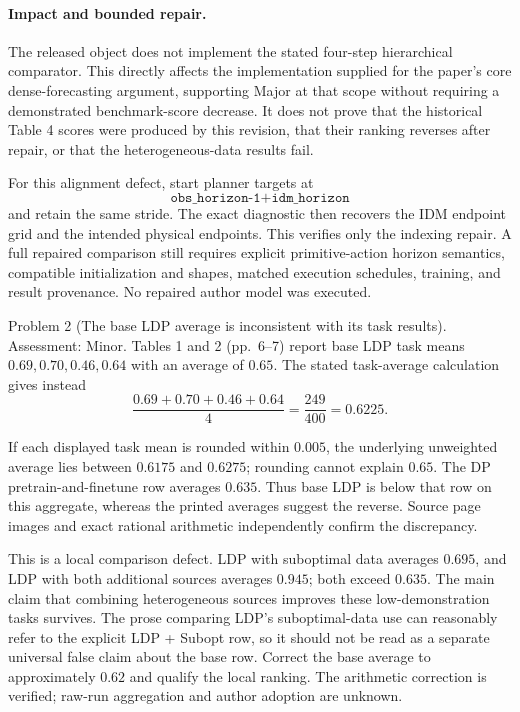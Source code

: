 \documentclass[10pt]{article}
\begin{document}
\paragraph*{Impact and bounded repair.}\mbox{}\par
The released object does not implement the stated four-step hierarchical comparator. This directly affects the implementation supplied for the paper’s core dense-forecasting argument, supporting Major at that scope without requiring a demonstrated benchmark-score decrease. It does not prove that the historical Table 4 scores were produced by this revision, that their ranking reverses after repair, or that the heterogeneous-data results fail.\par
For this alignment defect, start planner targets at \[\texttt{obs\_horizon-1+idm\_horizon}\] and retain the same stride. The exact diagnostic then recovers the IDM endpoint grid and the intended physical endpoints. This verifies only the indexing repair. A full repaired comparison still requires explicit primitive-action horizon semantics, compatible initialization and shapes, matched execution schedules, training, and result provenance. No repaired author model was executed.\par
Problem 2 (The base LDP average is inconsistent with its task results).  Assessment: Minor. Tables 1 and 2 (pp. 6–7) report base LDP task means \(0.69,0.70,0.46,0.64\) with an average of \(0.65\). The stated task-average calculation gives instead \[\frac{0.69+0.70+0.46+0.64}{4}=\frac{249}{400}=0.6225.\]\par
If each displayed task mean is rounded within \(0.005\), the underlying unweighted average lies between \(0.6175\) and \(0.6275\); rounding cannot explain \(0.65\). The DP pretrain-and-finetune row averages \(0.635\). Thus base LDP is below that row on this aggregate, whereas the printed averages suggest the reverse. Source page images and exact rational arithmetic independently confirm the discrepancy.\par
This is a local comparison defect. LDP with suboptimal data averages \(0.695\), and LDP with both additional sources averages \(0.945\); both exceed \(0.635\). The main claim that combining heterogeneous sources improves these low-demonstration tasks survives. The prose comparing LDP’s suboptimal-data use can reasonably refer to the explicit LDP + Subopt row, so it should not be read as a separate universal false claim about the base row. Correct the base average to approximately \(0.62\) and qualify the local ranking. The arithmetic correction is verified; raw-run aggregation and author adoption are unknown.\par
\end{document}
